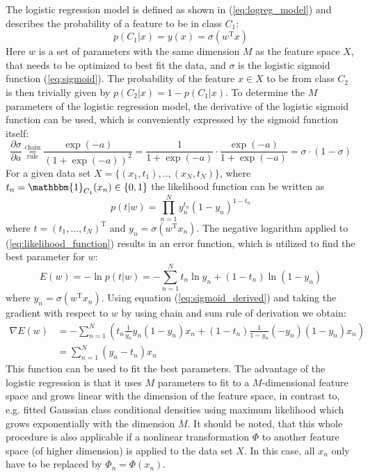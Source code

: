 The logistic regression model is defined as shown in (\ref{eq:logreg_model}) and describes the probability of a feature to be in class $C_1$:
\begin{equation} \label{eq:logreg_model}
p(C_1|x) = y(x) = \sigma(w^\text{T}x)
\end{equation}
Here $w$ is a set of parameters with the same dimension $M$ as the feature space $X$, that needs to be optimized to best fit the data, and $\sigma$ is the logistic sigmoid function (\ref{eq:sigmoid}). The probability of the feature $x \in X$ to be from class $C_2$ is then trivially given by $p(C_2|x) = 1 - p(C_1|x)$. To determine the $M$ parameters of the logistic regression model, the derivative of the logistic sigmoid function can be used, which is conveniently expressed by the sigmoid function itself:
\begin{equation} \label{eq:sigmoid_derived}
\frac{\partial \sigma}{\partial a} \overset{\text{chain}}{\underset{\text{rule}}{=}} \frac{\exp(-a)}{(1+\exp(-a))^2} = \frac{1}{1+\exp(-a)} \cdot \frac{\exp(-a)}{1+\exp(-a)}= \sigma \cdot(1-\sigma)
\end{equation}
For a given data set $X = \{(x_1,t_1), .. , (x_N,t_N)\}$, where $t_n = \mathbbm{1}_{C_1}(x_n) \in \{0,1\}$ the likelihood function can be written as
\begin{equation} \label{eq:likelihood_function}
p(t|w)=\prod_{n=1}^{N}y_n^{t_n} (1-y_n)^{1-t_n}
\end{equation}
where $t=(t_1, \dots, t_N)^\text{T}$ and $y_n = \sigma(w^\text{T}x_n)$. 
The negative logarithm applied to (\ref{eq:likelihood_function}) results in an error function, which is utilized to find the best parameter for $w$:
\begin{equation} \label{eq:likelihood_function}
E(w)=-\ln p(t|w) = - \sum_{n=1}^{N}t_n \ln y_n + (1-t_n) \ln (1-y_n)
\end{equation}
where $y_n=\sigma(w^\text{T}x_n)$. Using equation (\ref{eq:sigmoid_derived}) and taking the gradient with respect to $w$ by using chain and sum rule of derivation we obtain:
\begin{equation} \label{eq:lin_reg_gradient}
\begin{split}
\nabla E(w) &= - \sum_{n=1}^{N} \left( t_n \frac{1}{y_n} y_n(1-y_n)x_n + (1-t_n)\frac{1}{1-y_n}(-y_n)(1-y_n)x_n \right)\\ &=\sum_{n=1}^{N} (y_n-t_n)x_n
\end{split}
\end{equation}
This function can be used to fit the best parameters.
The advantage of the logistic regression is that it uses $M$ parameters to fit to a $M$-dimensional feature space and grows linear with the dimension of the feature space, in contrast to, e.g. fitted Gaussian class conditional densities using maximum likelihood which grows exponentially with the dimension $M$. It should be noted, that this whole procedure is also applicable if a nonlinear transformation $\Phi$ to another feature space (of higher dimension) is applied to the data set $X$. In this case, all $x_n$ only have to be replaced by $\Phi_n = \Phi(x_n)$. \cite{Bishop}